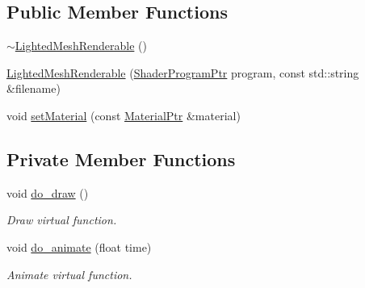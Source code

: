 \subsection*{Public Member Functions}
\begin{DoxyCompactItemize}
\item 
\hyperlink{classLightedMeshRenderable_a9d63d77cb9fb570b7ff61b32b1d19367}{$\sim$\+Lighted\+Mesh\+Renderable} ()
\item 
\hyperlink{classLightedMeshRenderable_a1631f932be02e2df689ada7a79f6f77b}{Lighted\+Mesh\+Renderable} (\hyperlink{ShaderProgram_8hpp_af8e4af1ad4c53875ee5d32ab7e1f4966}{Shader\+Program\+Ptr} program, const std\+::string \&filename)
\item 
void \hyperlink{classLightedMeshRenderable_acbc08d68271c47c60c36dfa52e90b340}{set\+Material} (const \hyperlink{Material_8hpp_a1d47cd05ca683e287435cf0b363fbfe1}{Material\+Ptr} \&material)
\end{DoxyCompactItemize}
\subsection*{Private Member Functions}
\begin{DoxyCompactItemize}
\item 
void \hyperlink{classLightedMeshRenderable_a7e4e538e3f45818789f28924fd18a478}{do\+\_\+draw} ()
\begin{DoxyCompactList}\small\item\em Draw virtual function. \end{DoxyCompactList}\item 
void \hyperlink{classLightedMeshRenderable_aa22c64fe3f33f88c164ffa087c9ec71f}{do\+\_\+animate} (float time)
\begin{DoxyCompactList}\small\item\em Animate virtual function. \end{DoxyCompactList}\end{DoxyCompactItemize}
